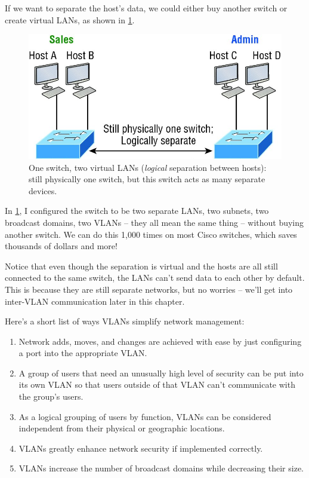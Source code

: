 \documentclass[b5paper,11pt]{memoir}
\begin{document}
If we want to separate the host's data, we could either buy another
switch or create virtual LANs, as shown in \cref{fig:one-switch-two-lan}.

\begin{figure}
   \centering
   \includegraphics{images/c11f004.jpg}
   \caption[One switch, two virtual LANs]{One switch, two virtual LANs (\emph{logical} separation between hosts): still physically one switch, but this switch acts as many separate devices.}
   \label{fig:one-switch-two-lan}
\end{figure}

In \cref{fig:one-switch-two-lan}, I configured the switch to be two separate LANs, two subnets, two broadcast domains, two VLANs -- they all mean the same thing -- without buying another switch.
We can do this 1,000 times on most Cisco switches, which saves thousands of dollars and more!

Notice that even though the separation is virtual and the hosts are all still connected to the same switch, the LANs can't send data to each other by default.
This is because they are still separate networks, but no worries -- we'll get into inter-VLAN communication later in this chapter.

Here's a short list of ways VLANs simplify network management:

\begin{enumerate}
   \item
      Network adds, moves, and changes are achieved with ease by just configuring a port into the appropriate VLAN.
   \item
      A group of users that need an unusually high level of security can be put into its own VLAN so that users outside of that VLAN can't communicate with the group's users.
   \item
   As a logical grouping of users by function, VLANs can be considered independent from their physical or geographic locations.
   \item
   VLANs greatly enhance network security if implemented correctly.
   \item
   VLANs increase the number of broadcast domains while decreasing their size.
\end{enumerate}
\end{document}
